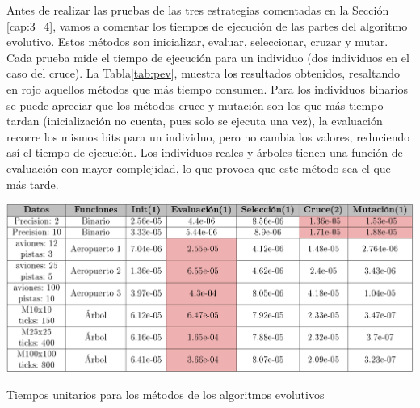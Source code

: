 						
		Antes de realizar las pruebas de las tres estrategias comentadas en la Sección \ref{cap:3_4}, vamos a comentar los tiempos de ejecución de las partes del algoritmo evolutivo. Estos métodos son inicializar, evaluar, seleccionar, cruzar y mutar. Cada prueba mide el tiempo de ejecución para un individuo (dos individuos en el caso del cruce). La Tabla\ref{tab:pev}, muestra los resultados obtenidos, resaltando en rojo aquellos métodos que más tiempo consumen. Para los individuos binarios se puede apreciar que los métodos cruce y mutación son los que más tiempo tardan (inicialización no cuenta, pues solo se ejecuta una vez), la evaluación recorre los mismos bits para un individuo, pero no cambia los valores, reduciendo así el tiempo de ejecución. Los individuos reales y árboles tienen una función de evaluación con mayor complejidad, lo que provoca que este método sea el que más tarde. 
		
		
		
		\begin{table}[!h]
			\centering
			\includegraphics[width=1\textwidth]{images/chapter_4/tabla_pev}		
			\caption{Tiempos unitarios para los métodos de los algoritmos evolutivos}
			\label{tab:pev}
		\end{table}
		
